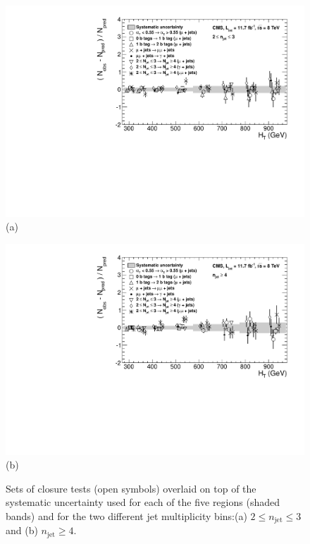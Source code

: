 \begin{figure}[ht]
\centering
\begin{minipage}[b]{0.85 \linewidth}
\includegraphics[width = 1.0\linewidth]{plots/syst-le3j.pdf}
\centering(a)  
\end{minipage}
\quad
\begin{minipage}[b]{0.85\linewidth}
\includegraphics[width = 1.0\linewidth]{plots/syst-ge4j.pdf}
\centering(b) 
\end{minipage}
\caption[Sets of closure tests overlaid on top of the systematic uncertainty used for each of the five \theht regions.]{Sets of closure tests (open symbols) overlaid on top of the systematic uncertainty used for each of the five \theht regions (shaded bands) and for the two different jet multiplicity bins:(a) $2 \leq n_{\text{jet}} \leq 3$ and (b) $n_{\text{jet}} \geq 4$.}
\label{fig:uncertaintyplots}
\end{figure}

